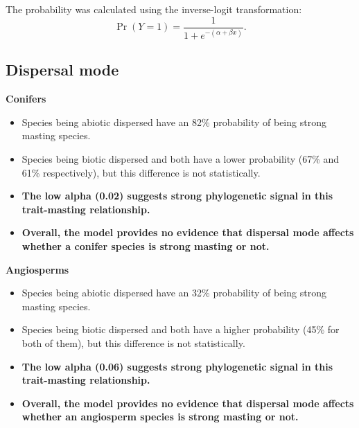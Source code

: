 \documentclass{article}
\begin{document}
The probability was calculated using the inverse-logit transformation:
\[
\Pr(Y = 1) = \frac{1}{1 + e^{-(\alpha + \beta x)}}.
\]


\subsection{Dispersal mode}
\textbf{Conifers}\\
\begin{itemize}
\item Species being abiotic dispersed have an 82\% probability of being strong masting species.
\item Species being biotic dispersed and both have a lower probability (67\% and 61\% respectively), but this difference is not statistically.
\item \textbf{The low alpha (0.02) suggests strong phylogenetic signal in this trait-masting relationship.}
\item \textbf{Overall, the model provides no evidence that dispersal mode affects whether a conifer species is strong masting or not.}
\end{itemize}
\textbf{Angiosperms}\\
\begin{itemize}
\item Species being abiotic dispersed have an 32\% probability of being strong masting species.
\item Species being biotic dispersed and both have a higher probability (45\% for both of them), but this difference is not statistically.
\item \textbf{The low alpha (0.06) suggests strong phylogenetic signal in this trait-masting relationship.}
\item \textbf{Overall, the model provides no evidence that dispersal mode affects whether an angiosperm species is strong masting or not.}
\end{itemize}
\end{document}
